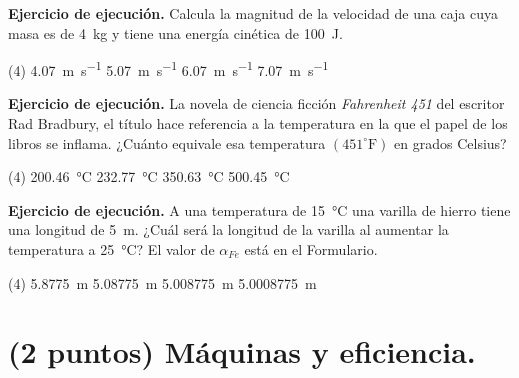 \documentclass[12pt, letter]{exam}
\begin{document}
\begin{questions}
    \question \label{Ejercicio_12} \textbf{Ejercicio de ejecución. } Calcula la magnitud de la velocidad de una caja cuya masa es de \SI{4}{\kilo\gram} y tiene una energía cinética de \SI{100}{\joule}.
    \begin{tasks}(4)
        \task \SI{4.07}{\meter\per\second}
        \task \SI{5.07}{\meter\per\second}
        \task \SI{6.07}{\meter\per\second}
        \task \SI{7.07}{\meter\per\second}
    \end{tasks}

    \newpage

    \question \label{Ejercicio_13} \textbf{Ejercicio de ejecución. } La novela de ciencia ficción \textit{Fahrenheit 451} del escritor Rad Bradbury, el título hace referencia a la temperatura en la que el papel de los libros se inflama. ¿Cuánto equivale esa temperatura $(451 ^{\circ}\text{F})$ en grados Celsius?
    \begin{tasks}(4)
        \task \SI{200.46}{\degreeCelsius}
        \task \SI{232.77}{\degreeCelsius}
        \task \SI{350.63}{\degreeCelsius}
        \task \SI{500.45}{\degreeCelsius}
    \end{tasks}
    \question \label{Ejercicio_14} \textbf{Ejercicio de ejecución. } A una temperatura de \SI{15}{\degreeCelsius} una varilla de hierro tiene una longitud de \SI{5}{\meter}. ¿Cuál será la longitud de la varilla al aumentar la temperatura a \SI{25}{\degreeCelsius}? El valor de $\alpha_{Fe}$ está en el Formulario.
    \begin{tasks}(4)
        \task \SI{5.8775}{\meter}
        \task \SI{5.08775}{\meter}
        \task \SI{5.008775}{\meter}
        \task \SI{5.0008775}{\meter}
    \end{tasks}

    \section{(2 puntos) Máquinas y eficiencia.}

    

\end{questions}
\end{document}
